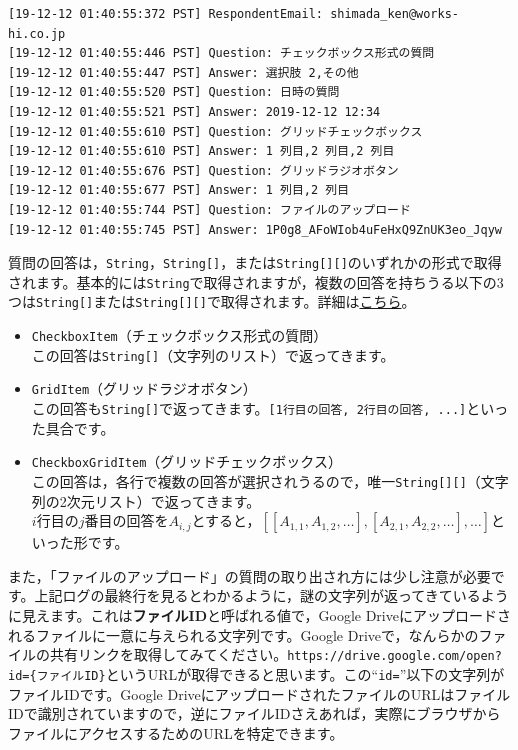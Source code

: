 \documentclass[uplatex,a4j]{jsarticle}
\begin{document}
\begin{lstlisting}[basicstyle=\ttfamily\footnotesize,frame=single,caption=Event Object sample 6]
[19-12-12 01:40:55:372 PST] RespondentEmail: shimada_ken@works-hi.co.jp
[19-12-12 01:40:55:446 PST] Question: チェックボックス形式の質問
[19-12-12 01:40:55:447 PST] Answer: 選択肢 2,その他
[19-12-12 01:40:55:520 PST] Question: 日時の質問
[19-12-12 01:40:55:521 PST] Answer: 2019-12-12 12:34
[19-12-12 01:40:55:610 PST] Question: グリッドチェックボックス
[19-12-12 01:40:55:610 PST] Answer: 1 列目,2 列目,2 列目
[19-12-12 01:40:55:676 PST] Question: グリッドラジオボタン
[19-12-12 01:40:55:677 PST] Answer: 1 列目,2 列目
[19-12-12 01:40:55:744 PST] Question: ファイルのアップロード
[19-12-12 01:40:55:745 PST] Answer: 1P0g8_AFoWIob4uFeHxQ9ZnUK3eo_Jqyw
\end{lstlisting}


質問の回答は，\verb|String|，\verb|String[]|，または\verb|String[][]|のいずれかの形式で取得されます。基本的には\verb|String|で取得されますが，複数の回答を持ちうる以下の3つは\verb|String[]|または\verb|String[][]|で取得されます。詳細は\href{https://developers.google.com/apps-script/reference/forms/item-response.html?hl=en#getResponse()}{こちら}。
\begin{itemize}
\item \verb|CheckboxItem|（チェックボックス形式の質問）\\
この回答は\verb|String[]|（文字列のリスト）で返ってきます。
\item \verb|GridItem|（グリッドラジオボタン）\\
この回答も\verb|String[]|で返ってきます。\verb|[1行目の回答, 2行目の回答, ...]|といった具合です。
\item \verb|CheckboxGridItem|（グリッドチェックボックス）\\
この回答は，各行で複数の回答が選択されうるので，唯一\verb|String[][]|（文字列の2次元リスト）で返ってきます。\\
$i$行目の$j$番目の回答を$A_{i, j}$とすると，$\left[\left[A_{1, 1}, A_{1, 2}, \dots\right], \left[A_{2, 1}, A_{2,2}, \dots\right], \dots\right]$といった形です。
\end{itemize}

また，「ファイルのアップロード」の質問の取り出され方には少し注意が必要です。上記ログの最終行を見るとわかるように，謎の文字列が返ってきているように見えます。これは\textbf{ファイルID}と呼ばれる値で，Google Driveにアップロードされるファイルに一意に与えられる文字列です。Google Driveで，なんらかのファイルの共有リンクを取得してみてください。\verb|https://drive.google.com/open?id={ファイルID}|というURLが取得できると思います。この``\verb|id=|''以下の文字列がファイルIDです。Google DriveにアップロードされたファイルのURLはファイルIDで識別されていますので，逆にファイルIDさえあれば，実際にブラウザからファイルにアクセスするためのURLを特定できます。
\end{document}
